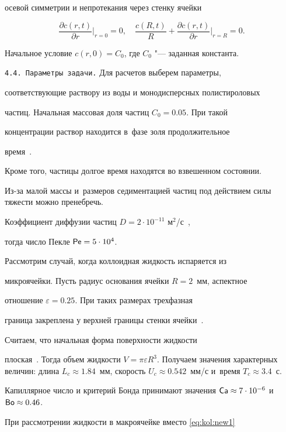 осевой симметрии и непротекания через стенку ячейки 

$$ 

\frac{\partial c(r, t)}{\partial r}\Big|_{r=0} = 0,\quad 

\frac{c(R, t)}{R}+ \frac{\partial c(r, t)}{\partial r}\Big|_{r=R} = 0.

$$

Начальное условие $c(r, 0) = C_0$, где $C_0$ "--- заданная константа.



\smallskip



\texttt{4.4. Параметры задачи.} Для расчетов выберем параметры,

соответствующие раствору из воды и монодисперсных полистироловых

частиц. Начальная массовая доля частиц $C_0 = 0.05$. При такой

концентрации раствор находится в~фазе золя продолжительное

время~\cite{Youngki2009}. 

Кроме того, частицы долгое время находятся во взвешенном состоянии. 

Из-за малой массы и~размеров седиментацией частиц под действием силы тяжести можно пренебречь. 

Коэффициент диффузии частиц $D = 2\cdot 10^{-11}$ м$^2$/с~\cite{Youngki2009},

тогда число Пекле $\mathop{\mathsf{Pe}} = 5\cdot 10^4$.



Рассмотрим случай, когда коллоидная жидкость испаряется из

микроячейки. Пусть радиус основания ячейки $R = 2$~мм, аспектное

отношение $\varepsilon = 0.25$. При таких размерах трехфазная

граница закреплена у верхней границы стенки ячейки~\cite{Rieger}.

Считаем, что начальная форма поверхности жидкости

плоская~\cite{Rieger}. Тогда объем жидкости $V = \pi \varepsilon

R^3$. Получаем значения характерных величин: длина $L_c \approx 1.84$~мм, скорость $U_c \approx 0.542$~мм/с и~время $T_c \approx 3.4$~с.

Капиллярное число и критерий Бонда принимают значения $\mathop{\mathsf{Ca}} \approx 7\cdot 10^{-6}$ и $\mathop{\mathsf{Bo}} \approx 0.46$.



При рассмотрении жидкости в макроячейке вместо \eqref{eq:kol:new1}  %

